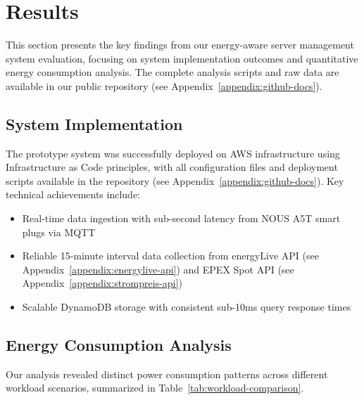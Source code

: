 

\section{Results}
\label{results:results}
This section presents the key findings from our energy-aware server management system evaluation, focusing on system implementation outcomes and quantitative energy consumption analysis. The complete analysis scripts and raw data are available in our public repository (see Appendix~\ref{appendix:github-docs}).

\subsection{System Implementation}
\label{results:system-implementation}
The prototype system was successfully deployed on AWS infrastructure using Infrastructure as Code principles, with all configuration files and deployment scripts available in the repository (see Appendix~\ref{appendix:github-docs}). Key technical achievements include:
\begin{itemize}
    \item Real-time data ingestion with sub-second latency from NOUS A5T smart plugs via MQTT
    \item Reliable 15-minute interval data collection from energyLive API (see Appendix~\ref{appendix:energylive-api}) and EPEX Spot API (see Appendix~\ref{appendix:strompreis-api})
    \item Scalable DynamoDB storage with consistent sub-10ms query response times
\end{itemize}

\subsection{Energy Consumption Analysis}
\label{results:energy-analysis}
Our analysis revealed distinct power consumption patterns across different workload scenarios, summarized in Table~\ref{tab:workload-comparison}.

